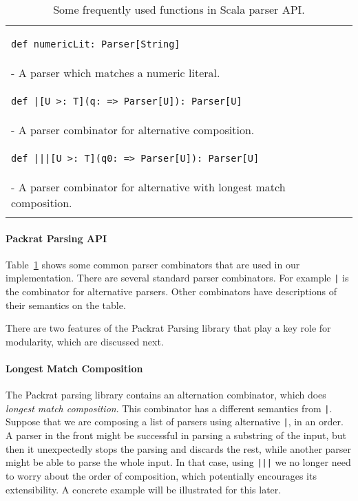 \begin{table}[t]
\begin{tabular}{l}
\hline
\begin{lstlisting}
def numericLit: Parser[String]
\end{lstlisting} \\
\hspace{.2in}- A parser which matches a numeric literal. \\
\hline
\begin{lstlisting}
def |[U >: T](q: => Parser[U]): Parser[U]
\end{lstlisting} \\
\hspace{.2in}- A parser combinator for alternative composition. \\
\hline
\begin{lstlisting}
def |||[U >: T](q0: => Parser[U]): Parser[U]
\end{lstlisting} \\
\hspace{.2in}- A parser combinator for alternative with longest match composition. \\
\hline \\
\end{tabular}
\caption{Some frequently used functions in Scala parser API.}\label{tab1}
\end{table}

\paragraph{Packrat Parsing API} Table~\ref{tab1} shows some common parser combinators
that are used in our implementation.  There are several standard
parser combinators. For example \lstinline{|} is the combinator for
alternative parsers. Other combinators have descriptions of their
semantics on the table.

There are two features of the Packrat Parsing library that play a key role
for modularity, which are discussed next.

\paragraph{Longest Match Composition} The Packrat parsing library
contains an alternation combinator, which does \emph{longest match
  composition}. This combinator has a different semantics from
\lstinline{|}.
Suppose that we are composing a list of parsers using alternative
\lstinline{|}, in an order. A parser in the front might be successful
in parsing a substring of the input, but then it unexpectedly stops
the parsing and discards the rest, while another parser might be able
to parse the whole input. In that case, using \lstinline{|||} we no
longer need to worry about the order of composition, which potentially
encourages its extensibility. A concrete example will be illustrated
for this later. 

